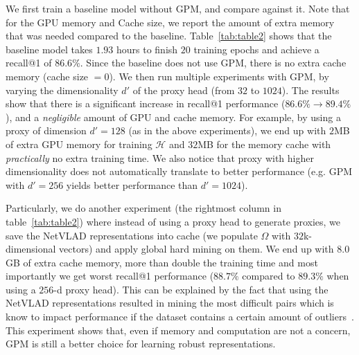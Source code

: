 \documentclass{bmvc2k}
\begin{document}
We first train a baseline model without GPM, and compare against it. Note that for the GPU memory and Cache size, we report the amount of extra memory that was needed compared to the baseline.  
Table~\ref{tab:table2} shows that the baseline model takes $1.93$ hours to finish $20$ training epochs and achieve a recall@1 of $86.6\%$. Since the baseline does not use GPM, there is no extra cache memory (cache size $= 0$).
We then run multiple experiments with GPM, by varying the dimensionality $d'$ of the proxy head (from $32$ to $1024$). The results show that there is  a significant increase in recall@1 performance ($86.6\% \rightarrow 89.4\%$), and a \textit{negligible} amount of GPU and cache memory. For example, by using a proxy of dimension $d'=128$ (as in the above experiments), we end up with $2$MB of extra GPU memory for training $\mathcal{H}$ and $32$MB for the memory cache with \textit{practically} no extra training time. We also notice that proxy with higher dimensionality does not automatically translate to better performance (e.g. GPM with $d'=256$ yields better performance than $d'=1024$).

Particularly, we do another experiment (the rightmost column in table~\ref{tab:table2}) where instead of using a proxy head to generate proxies, we save the NetVLAD representations into cache (we populate $\Omega$ with $32$k-dimensional vectors) and apply global hard mining on them. We end up with $8.0$GB of extra cache memory, more than double the training time and most importantly we get worst recall@1 performance ($88.7\%$ compared to $89.3\%$ when using a $256$-d proxy head). This can be explained by the fact that using the NetVLAD representations resulted in mining the most difficult pairs which is know to impact performance if the dataset contains a certain amount of outliers~\cite{hermans2017defense}. This experiment shows that, even if memory and computation are not a concern, GPM is still a better choice for learning robust representations.
\end{document}
